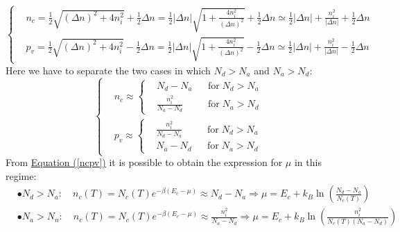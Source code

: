 \documentclass[10.75pt,a4paper,openright,bottom=2cm]{article}
\renewcommand{\refeq}[1]{\hyperref[#1]{Equation (\ref{#1})}}
\begin{document}
\[
\left\{
\begin{aligned}
&n_c=\frac{1}{2}\sqrt{(\Delta n)^2+4n_i^2}+\frac{1}{2}\Delta n=\frac{1}{2}|\Delta n|\sqrt{1+\frac{4n_i^2}{(\Delta n)^2}}+\frac{1}{2}\Delta n\simeq \frac{1}{2}|\Delta n|+\frac{n_i^2}{|\Delta n|}+\frac{1}{2}\Delta n\\
&p_v=\frac{1}{2}\sqrt{(\Delta n)^2+4n_i^2}-\frac{1}{2}\Delta n=\frac{1}{2}|\Delta n|\sqrt{1+\frac{4n_i^2}{(\Delta n)^2}}-\frac{1}{2}\Delta n\simeq \frac{1}{2}|\Delta n|+\frac{n_i^2}{|\Delta n|}-\frac{1}{2}\Delta n
\end{aligned}
\right.
\]
Here we have to separate the two cases in which $N_d>N_a$ and $N_a>N_d$:
\[
\left\{
\begin{aligned}
&n_c\approx\left\{
\begin{aligned}&N_d-N_a&&\text{for}\;N_d>N_a\\
&\frac{n_i^2}{N_a-N_d}&&\text{for}\;N_a>N_d
\end{aligned}
\right.\\
&p_v\approx\left\{
\begin{aligned}&\frac{n_i^2}{N_d-N_a}&&\text{for}\;N_d>N_a\\
&N_a-N_d&&\text{for}\;N_a>N_d
\end{aligned}
\right.
\end{aligned}
\right.
\]
From \refeq{ncpv} it is possible to obtain the expression for $\mu$ in this regime:
\[
\begin{aligned}
&\bullet N_d>N_a: \quad n_c(T)=N_c(T)e^{-\beta(E_c-\mu)}\approx N_d-N_a\Rightarrow\mu=E_c+k_B\ln\left(\frac{N_d-N_a}{N_c(T)}\right)\\
&\bullet N_a>N_n: \quad n_c(T)=N_c(T)e^{-\beta(E_c-\mu)}\approx \frac{n_i^2}{N_a-N_d}\Rightarrow\mu=E_c+k_B\ln\left(\frac{n_i^2}{N_c(T)(N_a-N_d)}\right)
\end{aligned}
\]
\end{document}
